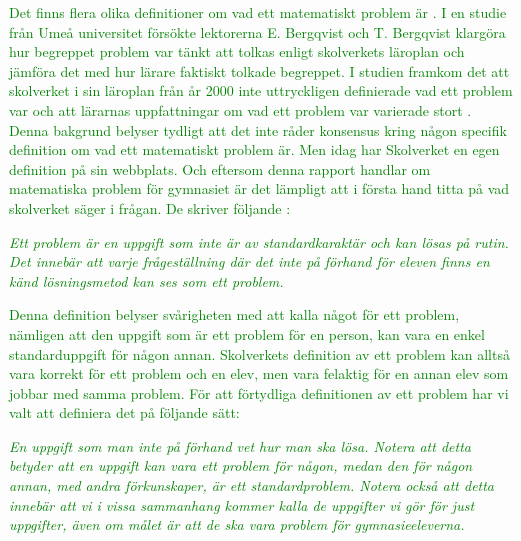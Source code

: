 
\textcolor{green}{Det finns flera olika definitioner om vad ett matematiskt problem är \cite{olikaDefinitioner}. I en studie från Umeå universitet försökte lektorerna E. Bergqvist och T. Bergqvist klargöra hur begreppet problem var tänkt att tolkas enligt skolverkets läroplan och jämföra det med hur lärare faktiskt tolkade begreppet. I studien framkom det att skolverket i sin läroplan från år 2000 inte uttryckligen definierade vad ett problem var och att lärarnas uppfattningar om vad ett problem var varierade stort \cite{problemVarierandeDef}. Denna bakgrund belyser tydligt att det inte råder konsensus kring någon specifik definition om vad ett matematiskt problem är. Men idag har Skolverket en egen definition på sin webbplats. Och eftersom denna rapport handlar om matematiska problem för gymnasiet är det lämpligt att i första hand titta på vad skolverket säger i frågan. De skriver följande \cite{ProblemDef}:}

\begin{displayquote}
\textcolor{green}{\textsl{Ett problem är en uppgift som inte är av standardkaraktär och kan lösas på rutin. Det innebär att varje frågeställning där det inte på förhand för eleven finns en känd lösningsmetod kan ses som ett problem.}}
\end{displayquote}

\textcolor{green}{Denna definition belyser svårigheten med att kalla något för ett problem, nämligen att den uppgift som är ett problem för en person, kan vara en enkel standarduppgift för någon annan. Skolverkets definition av ett problem kan alltså vara korrekt för ett problem och en elev, men vara felaktig för en annan elev som jobbar med samma problem. För att förtydliga definitionen av ett problem har vi valt att definiera det på följande sätt: }

\begin{displayquote}
\textcolor{green}{\textsl{En uppgift som man inte på förhand vet hur man ska lösa. Notera att detta betyder att en uppgift kan vara ett problem för någon, medan den för någon annan, med andra förkunskaper, är ett standardproblem. Notera också att detta innebär att vi i vissa sammanhang kommer kalla de uppgifter vi gör för just uppgifter, även om målet är att de ska vara problem för gymnasieeleverna.}}
\end{displayquote}

